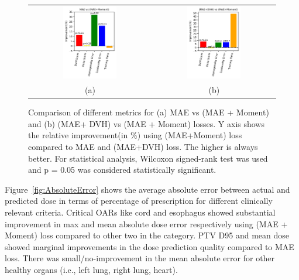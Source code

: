 \documentclass[10pt]{article}
\begin{document}
\begin{figure}[t!]
\begin{center}
\footnotesize
\setlength{\tabcolsep}{8pt}
\begin{tabular}{cc}
\includegraphics[width=0.46\textwidth]{MAEvsMom.pdf}&
\includegraphics[width=0.46\textwidth]{DVHvsMom.pdf}\\
(a) & (b)\\
\end{tabular}
\end{center}
\caption{Comparison of different metrics for (a) MAE vs (MAE + Moment) and (b) (MAE+ DVH) vs (MAE + Moment) losses. Y axis shows the relative improvement(in \%) using (MAE+Moment) loss compared to MAE and (MAE+DVH) loss. The higher is always better. For statistical analysis, Wilcoxon signed-rank test was used and p = 0.05 was considered statistically significant. }
\label{fig:metrics}
\end{figure}

Figure~\ref{fig:AbsoluteError} shows the average absolute error between actual and predicted dose in terms of percentage of prescription for different clinically relevant criteria. Critical OARs like cord and esophagus showed substantial improvement in max and mean absolute dose error respectively using (MAE + Moment) loss compared to other two in the category. {PTV D95 and mean dose} showed marginal improvements in the dose prediction quality compared to MAE loss. There was small/no-improvement in the mean absolute error for other healthy organs (i.e., left lung, right lung, heart).
\end{document}
